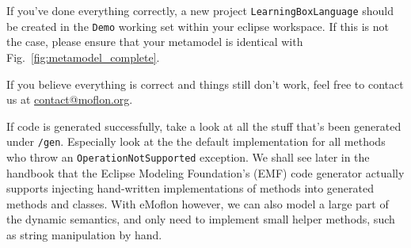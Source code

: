 If you've done everything correctly, a new project \texttt{LearningBoxLanguage} should be created in the \texttt{Demo} working set within your eclipse
workspace. If this is not the case, please ensure that your metamodel is identical with Fig.~\ref{fig:metamodel_complete}.

If you believe everything is correct and things still don't work, feel free to contact us at \href{mailto:contact@moflon.org}{contact@moflon.org}.

If code is generated successfully, take a look at all the stuff that's been generated under \texttt{/gen}. Especially look at the the default implementation for
all methods who throw an  \texttt{OperationNotSupported} exception. We shall see later in the handbook that the Eclipse Modeling Foundation's (EMF) code
generator actually supports injecting hand-written implementations of methods into generated methods and classes. With eMoflon however, we can also model a
large part of the dynamic semantics, and only need to implement small helper methods, such as string manipulation by hand.

